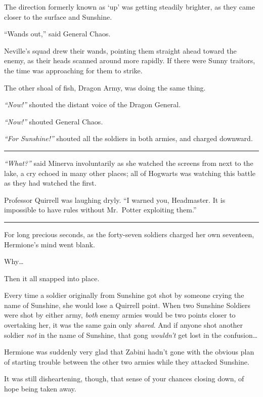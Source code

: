 The direction formerly known as `up' was getting steadily brighter, as
they came closer to the surface and Sunshine.

``Wands out,'' said General Chaos.

Neville's squad drew their wands, pointing them straight ahead toward
the enemy, as their heads scanned around more rapidly. If there were
Sunny traitors, the time was approaching for them to strike.

The other shoal of fish, Dragon Army, was doing the same thing.

\emph{``Now!''} shouted the distant voice of the Dragon General.

\emph{``Now!''} shouted General Chaos.

\emph{``For Sunshine!''} shouted all the soldiers in both armies, and
charged downward.

\begin{center}\rule{3in}{0.4pt}\end{center}

\emph{``What?''} said Minerva involuntarily as she watched the screens
from next to the lake, a cry echoed in many other places; all of
Hogwarts was watching this battle as they had watched the first.

Professor Quirrell was laughing dryly. ``I warned you, Headmaster. It is
impossible to have rules without Mr.~Potter exploiting them.''

\begin{center}\rule{3in}{0.4pt}\end{center}

For long precious seconds, as the forty-seven soldiers charged her own
seventeen, Hermione's mind went blank.

Why\ldots{}

Then it all snapped into place.

Every time a soldier originally from Sunshine got shot by someone crying
the name of Sunshine, she would lose a Quirrell point. When two Sunshine
Soldiers were shot by either army, \emph{both} enemy armies would be two
points closer to overtaking her, it was the same gain only
\emph{shared}. And if anyone shot another soldier \emph{not} in the name
of Sunshine, that gong \emph{wouldn't} get lost in the confusion\ldots{}

Hermione was suddenly very glad that Zabini hadn't gone with the obvious
plan of starting trouble between the other two armies while they
attacked Sunshine.

It was still disheartening, though, that sense of your chances closing
down, of hope being taken away.

